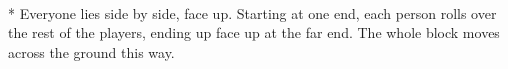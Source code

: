 \begin{minipage}{\textwidth}
\\*
Everyone lies side by side, face up. Starting at one end, each person rolls over the rest of the players, ending up face up at the far end.  The whole block moves across the ground this way.
\end{minipage}    \vfill

